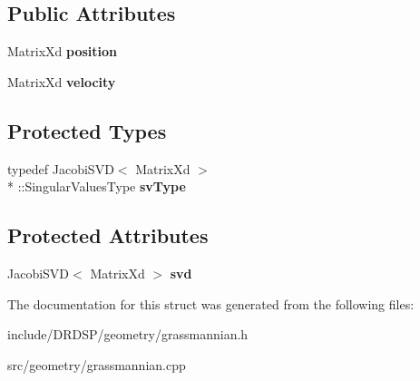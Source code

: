 \subsection*{Public Attributes}
\begin{DoxyCompactItemize}
\item 
\hypertarget{struct_d_r_d_s_p_1_1_grassmannian_1_1_geodesic_abee018a46f9c7afb66d8b34738222dc1}{Matrix\-Xd {\bfseries position}}\label{struct_d_r_d_s_p_1_1_grassmannian_1_1_geodesic_abee018a46f9c7afb66d8b34738222dc1}

\item 
\hypertarget{struct_d_r_d_s_p_1_1_grassmannian_1_1_geodesic_acc96319d2d4ff34280463d23b56e4615}{Matrix\-Xd {\bfseries velocity}}\label{struct_d_r_d_s_p_1_1_grassmannian_1_1_geodesic_acc96319d2d4ff34280463d23b56e4615}

\end{DoxyCompactItemize}
\subsection*{Protected Types}
\begin{DoxyCompactItemize}
\item 
\hypertarget{struct_d_r_d_s_p_1_1_grassmannian_1_1_geodesic_a7ec327eb6529ec4ac20f7e5983aea099}{typedef Jacobi\-S\-V\-D$<$ Matrix\-Xd $>$\\*
\-::Singular\-Values\-Type {\bfseries sv\-Type}}\label{struct_d_r_d_s_p_1_1_grassmannian_1_1_geodesic_a7ec327eb6529ec4ac20f7e5983aea099}

\end{DoxyCompactItemize}
\subsection*{Protected Attributes}
\begin{DoxyCompactItemize}
\item 
\hypertarget{struct_d_r_d_s_p_1_1_grassmannian_1_1_geodesic_a830c4664220a4ac0e4b081c29d352215}{Jacobi\-S\-V\-D$<$ Matrix\-Xd $>$ {\bfseries svd}}\label{struct_d_r_d_s_p_1_1_grassmannian_1_1_geodesic_a830c4664220a4ac0e4b081c29d352215}

\end{DoxyCompactItemize}


The documentation for this struct was generated from the following files\-:\begin{DoxyCompactItemize}
\item 
include/\-D\-R\-D\-S\-P/geometry/grassmannian.\-h\item 
src/geometry/grassmannian.\-cpp\end{DoxyCompactItemize}
